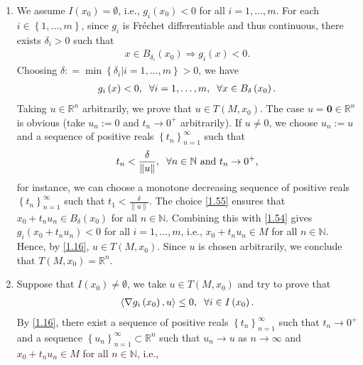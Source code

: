\documentclass[a4paper]{article}
\numberwithin{equation}{section}
\begin{document}
\begin{enumerate}
\item We assume $I\left(x_0\right)=\emptyset$, i.e., $g_i\left(x_0\right) <0$ for all $i=1,\ldots,m$. For each $i \in \left\{ {1, \ldots ,m} \right\}$, since $g_i$ is Fr\'{e}chet differentiable and thus continuous, there exists $\delta _i>0$ such that
\begin{align}
x \in {B_{{\delta _i}}}\left( {{x_0}} \right) \Rightarrow {g_i}\left( x \right) < 0.
\end{align}
Choosing $\delta : = \min \left\{ {{\delta _i}|i = 1, \ldots ,m} \right\} >0$, we have
\begin{align}
\label{1.54}
{g_i}\left( x \right) < 0, \hspace{0.2cm}\forall i = 1, \ldots ,m, \hspace{0.2cm}\forall x \in {B_\delta }\left( {{x_0}} \right).
\end{align}
Taking $u\in \mathbb{R}^n$ arbitrarily, we prove that $u\in T\left(M,x_0\right)$. The case $u=\mathbf{0} \in \mathbb{R}^n$ is obvious (take $u_n:=0$ and $t_n\to 0^+$ arbitrarily). If $u\ne 0$, we choose $u_n:=u$ and a sequence of positive reals $\left\{ {{t_n}} \right\}_{n = 1}^\infty $ such that 
\begin{align}
\label{1.55}
{t_n} < \frac{\delta }{{\left\| u \right\|}} , \hspace{0.2cm} \forall n  \in \mathbb{N} \mbox{ and } t_n\to 0^+, 
\end{align}
for instance, we can choose a monotone decreasing sequence of positive reals $\left\{ {{t_n}} \right\}_{n = 1}^\infty $ such that ${t_1} < \frac{\delta }{{\left\| u \right\|}}$. The choice \eqref{1.55} ensures that ${x_0} + {t_n}{u_n} \in {B_\delta }\left( {{x_0}} \right)$ for all $n\in\mathbb{N}$. Combining this with \eqref{1.54} gives ${g_i}\left( {{x_0} + {t_n}{u_n}} \right) < 0$ for all $i=1,\ldots,m$, i.e., ${x_0} + {t_n}{u_n} \in M$ for all $n\in \mathbb{N}$. Hence, by \eqref{1.16}, $u\in T\left(M,x_0\right)$. Since $u$ is chosen arbitrarily, we conclude that $T\left(M,x_0\right)=\mathbb{R}^n$.
\item Suppose that $I\left(x_0\right)\ne \emptyset$, we take $u\in T\left(M,x_0\right)$ and try to prove that 
\begin{align}
\label{1.56}
\left\langle {\nabla {g_i}\left( {{x_0}} \right),u} \right\rangle  \le 0, \hspace{0.2cm} \forall i \in I\left( {{x_0}} \right).
\end{align}
By \eqref{1.16}, there exist a sequence of positive reals $\left\{ {{t_n}} \right\}_{n = 1}^\infty $ such that $t_n\to 0^+$ and a sequence $\left\{ {{u_n}} \right\}_{n = 1}^\infty  \subset {\mathbb{R}^n}$ such that $u_n\to u$ as $n\to \infty$ and $x_0+t_n u_n\in M$ for all $n\in \mathbb{N}$, i.e., 

\end{enumerate}
\end{document}
